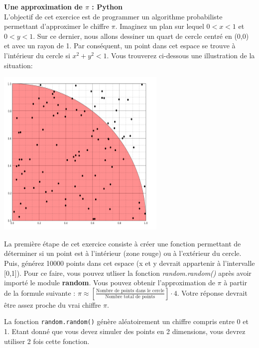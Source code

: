 \begin{Exercice}[20 minutes]\textbf{Une approximation de $\pi$ : Python}\\
L'objectif de cet exercice est de programmer un algorithme probabiliste permettant d'approximer le chiffre $\pi$. Imaginez un plan sur lequel $0 < x < 1$ et $0 < y < 1$. Sur ce dernier, nous allons dessiner un quart de cercle centré en (0,0) et avec un rayon de 1. Par conséquent, un point dans cet espace se trouve à l'intérieur du cercle si $x^2 + y^2 < 1$. Vous trouverez ci-dessous une illustration de la situation:
\begin{center}
\includegraphics[]{Cercle.PNG}
\end{center}
La première étape de cet exercice consiste à créer une fonction permettant de déterminer si un point est à l'intérieur (zone rouge) ou à l'extérieur du cercle. Puis, générez 10000 points dans cet espace (x et y devrait appartenir à l'intervalle [0,1]). Pour ce faire, vous pouvez utliser la fonction \textit{random.random()} après avoir importé le module \textbf{random}. Vous pouvez obtenir l'approximation de $\pi$ à partir de la formule suivante : $\pi \approx [\frac{\text{Nombre de points dans le cercle}}{\text{Nombre total de points}}]\cdot 4$. Votre réponse devrait être assez proche du vrai chiffre $\pi$.\\
\begin{conseil}
    La fonction \lstinline{random.random()} génère aléatoirement un chiffre compris entre 0 et 1. Etant donné que vous devez simuler des points en 2 dimensions, vous devrez utiliser 2 fois cette fonction.
\end{conseil}
\begin{solution}
 
\end{solution}

\end{Exercice}
\newpage
